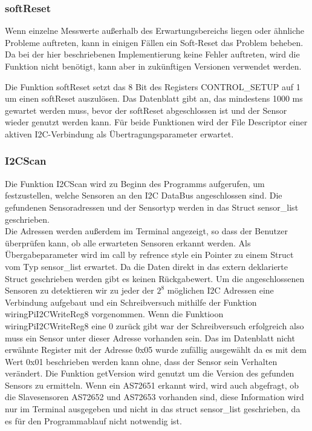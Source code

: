 %

\subsubsection{softReset}
Wenn einzelne Messwerte außerhalb des Erwartungsbereichs liegen oder ähnliche Probleme auftreten, kann in einigen Fällen ein Soft-Reset das Problem beheben.
Da bei der hier beschriebenen Implementierung keine Fehler auftreten, wird die Funktion nicht benötigt, kann aber in zukünftigen Versionen verwendet werden.

\noindent Die Funktion softReset setzt das 8 Bit des Registers CONTROL\_SETUP auf 1 um einen softReset auszulösen.
Das Datenblatt gibt an, das mindestens 1000 ms gewartet werden muss, bevor der softReset abgeschlossen ist und der Sensor wieder genutzt werden kann.
Für beide Funktionen wird der File Descriptor einer aktiven I2C-Verbindung als Übertragungsparameter erwartet.\\

%

\subsubsection{I2CScan}
Die Funktion I2CScan wird zu Beginn des Programms aufgerufen, um festzustellen, welche Sensoren an den I2C DataBus angeschlossen sind.
Die gefundenen Sensoradressen und der Sensortyp werden in das Struct sensor\_list geschrieben.\\
Die Adressen werden außerdem im Terminal angezeigt, so dass der Benutzer überprüfen kann, ob alle erwarteten Sensoren erkannt werden.
Als Übergabeparameter wird im call by refrence style ein Pointer zu einem Struct vom Typ sensor\_list erwartet.
Da die Daten direkt in das extern deklarierte Struct geschrieben werden gibt es keinen Rückgabewert.
Um die angeschlossenen Sensoren zu detektieren wir zu jeder der $2^8$ möglichen I2C Adressen eine Verbindung aufgebaut und ein Schreibversuch mithilfe der Funktion wiringPiI2CWriteReg8 vorgenommen.
Wenn die Funktioon wiringPiI2CWriteReg8 eine 0 zurück gibt war der Schreibversuch erfolgreich also muss ein Sensor unter dieser Adresse vorhanden sein.
Das im Datenblatt nicht erwähnte Register mit der Adresse 0x05 wurde zufällig ausgewählt da es mit dem Wert 0x01 beschrieben werden kann ohne, dass der Sensor sein Verhalten verändert.
Die Funktion getVersion wird genutzt um die Version des gefunden Sensors zu ermitteln.
Wenn ein AS72651 erkannt wird, wird auch abgefragt, ob die Slavesensoren AS72652 und AS72653 vorhanden sind, diese Information wird nur im Terminal ausgegeben und nicht in das struct sensor\_list geschrieben, da es für den Programmablauf nicht notwendig ist.\\

